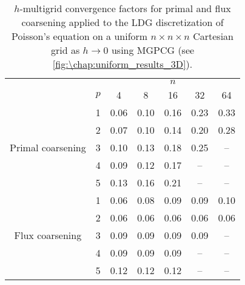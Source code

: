 \begin{table}[htb]
\caption{$h$-multigrid convergence factors for primal and flux coarsening applied to the LDG discretization of Poisson's equation on a uniform $n \times n \times n$ Cartesian grid as ${h\to 0}$ using MGPCG (see \cref{fig:\chap:uniform_results_3D}).\vspace{-1.8em}}
\label{tab:3D_uniform_mgpcg}
\centering
\small
\begin{tabular}{@{}cl@{\qquad}ccccc@{}}
&&&&&& \\ \midrule
&& \multicolumn{5}{c}{$n$} \\
& $p$ & 4 & 8 & 16 & 32 & 64 \\ \cmidrule{1-7}
\multirow{5}{*}{Primal coarsening}
& 1 & 0.06 & 0.10 & 0.16 & 0.23 & 0.33 \\ 
& 2 & 0.07 & 0.10 & 0.14 & 0.20 & 0.28 \\ 
& 3 & 0.10 & 0.13 & 0.18 & 0.25 &  --  \\ 
& 4 & 0.09 & 0.12 & 0.17 &  --  &  --  \\ 
& 5 & 0.13 & 0.16 & 0.21 &  --  &  --  \\ \cmidrule{1-7}
\multirow{5}{*}{Flux coarsening}
& 1 & 0.06 & 0.08 & 0.09 & 0.09 & 0.10 \\ 
& 2 & 0.06 & 0.06 & 0.06 & 0.06 & 0.06 \\ 
& 3 & 0.09 & 0.09 & 0.09 & 0.09 &  --  \\ 
& 4 & 0.09 & 0.09 & 0.09 &  --  &  --  \\ 
& 5 & 0.12 & 0.12 & 0.12 &  --  &  --  \\ \midrule
\end{tabular}
\end{table}

